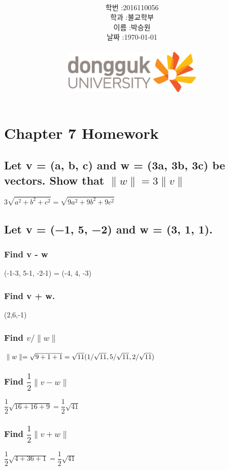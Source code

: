 \documentclass[12pt,a4paper]{article}
\title{
	\centering
	\pgfornament[width=12cm,color=teal]{84}\\
	\vspace{1cm}
	\fontsize{50}{50} \selectfont {정보통신 수학 및 실습\\Homework}\\
		\pgfornament[width=12cm,color=teal]{88}\\
	\vfill}
\author{
	\LARGE
	\begin{tabular}{rl}
		\hline
		학번 : & 2016110056\\ 
		학과 : & 불교학부 \\
		이름 : & 박승원\\
		날짜 : & \today\\
		\hline
	\end{tabular}\vspace{2cm}
	\\
\includegraphics[width=0.5\textwidth]{logo.jpg}
	}
\date{}
\begin{document}
\maketitle
{}
\noindent
\lstset{language=matlab, columns=flexible, tabsize=4, frame=shadowbox, showstringspaces=false, breaklines=true, upquote=true, basicstyle=\normalsize}

\renewcommand{\thesubsubsection}{\alph{subsubsection})}
\renewcommand{\thesubsection}{\arabic{subsection}.}
\newpage

\section*{Chapter 7 Homework}
\subsection{Let v = (a, b, c) and w = (3a, 3b, 3c) be vectors.  Show that $\parallel w\parallel = 3 \parallel v\parallel$}
	$3\sqrt{a^2+b^2+c^2} = \sqrt{9a^2+9b^2+9c^2}$
\subsection{Let v = (−1, 5, −2) and w = (3, 1, 1).}  
	
\subsubsection{Find v - w }
(-1-3, 5-1, -2-1) = (-4, 4, -3) 
\subsubsection{Find v + w. }
(2,6,-1)
\subsubsection{Find $v / \parallel w \parallel$ }
$\parallel w\parallel = \sqrt{9+1+1} = \sqrt{11}\\
(1/\sqrt{11}, 5/\sqrt{11}, 2/\sqrt{11})
$
\subsubsection{Find $\dfrac{1}{2}\parallel v - w\parallel$ }
$\dfrac{1}{2}\sqrt{16+16+9} = \dfrac{1}{2}\sqrt{41}$
\subsubsection{Find $\dfrac{1}{2}\parallel v + w\parallel$ }
$\dfrac{1}{2}\sqrt{4+36+1} = \dfrac{1}{2}\sqrt{41}$
\end{document}

